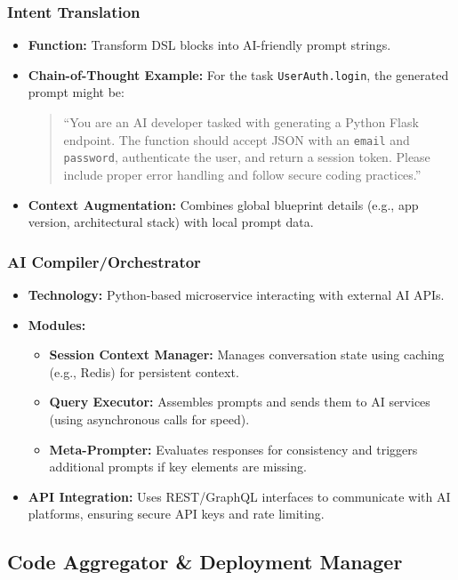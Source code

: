 \documentclass[11pt]{article}
\begin{document}
\subsubsection{Intent Translation}
\begin{itemize}
    \item \textbf{Function:} Transform DSL blocks into AI-friendly prompt strings.
    \item \textbf{Chain-of-Thought Example:} For the task \texttt{UserAuth.login}, the generated prompt might be:
    \begin{quote}
    ``You are an AI developer tasked with generating a Python Flask endpoint. The function should accept JSON with an \texttt{email} and \texttt{password}, authenticate the user, and return a session token. Please include proper error handling and follow secure coding practices.''
    \end{quote}
    \item \textbf{Context Augmentation:} Combines global blueprint details (e.g., app version, architectural stack) with local prompt data.
\end{itemize}

\subsubsection{AI Compiler/Orchestrator}
\begin{itemize}
    \item \textbf{Technology:} Python-based microservice interacting with external AI APIs.
    \item \textbf{Modules:}
    \begin{itemize}
        \item \textbf{Session Context Manager:} Manages conversation state using caching (e.g., Redis) for persistent context.
        \item \textbf{Query Executor:} Assembles prompts and sends them to AI services (using asynchronous calls for speed).
        \item \textbf{Meta-Prompter:} Evaluates responses for consistency and triggers additional prompts if key elements are missing.
    \end{itemize}
    \item \textbf{API Integration:} Uses REST/GraphQL interfaces to communicate with AI platforms, ensuring secure API keys and rate limiting.
\end{itemize}

\subsection{Code Aggregator \& Deployment Manager}
\end{document}
